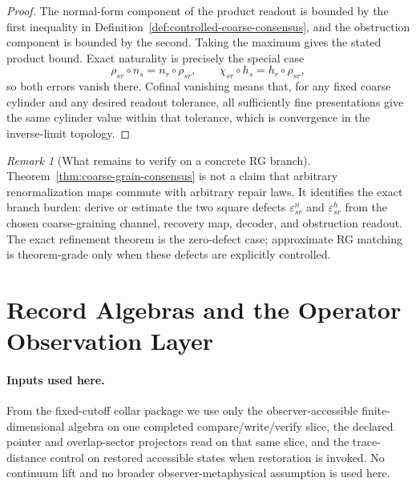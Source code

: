 \documentclass[11pt]{article}
\theoremstyle{remark}
\newtheorem{remark}[theorem]{Remark}
\theoremstyle{plain}
\begin{document}
\begin{proof}
The normal-form component of the product readout is bounded by the first inequality in
Definition~\ref{def:controlled-coarse-consensus}, and the obstruction component is bounded by the
second. Taking the maximum gives the stated product bound. Exact naturality is precisely the
special case
\[
\rho_{sr}\circ n_s=n_r\circ\rho_{sr},
\qquad
\chi_{sr}\circ h_s=h_r\circ\rho_{sr},
\]
so both errors vanish there. Cofinal vanishing means that, for any fixed coarse cylinder and any
desired readout tolerance, all sufficiently fine presentations give the same cylinder value
within that tolerance, which is convergence in the inverse-limit topology.
\end{proof}

\begin{remark}[What remains to verify on a concrete RG branch]\label{rem:coarse-grain-scope}
Theorem~\ref{thm:coarse-grain-consensus} is not a claim that arbitrary renormalization maps
commute with arbitrary repair laws. It identifies the exact branch burden: derive or estimate the
two square defects \(\varepsilon^n_{sr}\) and \(\varepsilon^h_{sr}\) from the chosen
coarse-graining channel, recovery map, decoder, and obstruction readout. The exact refinement
theorem is the zero-defect case; approximate RG matching is theorem-grade only when these defects
are explicitly controlled.
\end{remark}


\section{Record Algebras and the Operator Observation Layer}

\paragraph{Inputs used here.}
From the fixed-cutoff collar package we use only the observer-accessible finite-dimensional algebra
on one completed compare/write/verify slice, the declared pointer and overlap-sector projectors
read on that same slice, and the trace-distance control on restored accessible states when
restoration is invoked. No continuum lift and no broader observer-metaphysical assumption is used
here.
\end{document}
